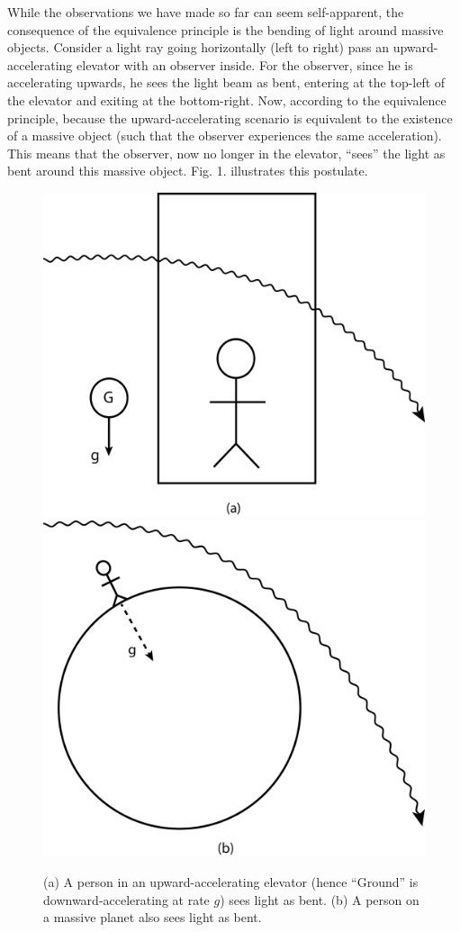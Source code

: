 \documentclass{article}
\theoremstyle{definition}
\begin{document}
While the observations we have made so far can seem self-apparent, the consequence of the equivalence principle is the bending of light around massive objects. Consider a light ray going horizontally (left to right) pass an upward-accelerating elevator with an observer inside. For the observer, since he is accelerating upwards, he sees the light beam as bent, entering at the top-left of the elevator and exiting at the bottom-right. Now, according to the equivalence principle, because the upward-accelerating scenario is equivalent to the existence of a massive object (such that the observer experiences the same acceleration). This means that the observer, now no longer in the elevator, ``sees'' the light as bent around this massive object. Fig. 1. illustrates this postulate.\\
\begin{figure}[h!]
	\centering
	\includegraphics[scale=0.15]{gr-fig-1a.png}
	\includegraphics[scale=0.15]{gr-fig-1b.png}
	\caption{(a) A person in an upward-accelerating elevator (hence ``Ground'' is downward-accelerating at rate $g$) sees light as bent. (b) A person on a massive planet also sees light as bent.}
\end{figure}
\end{document}
